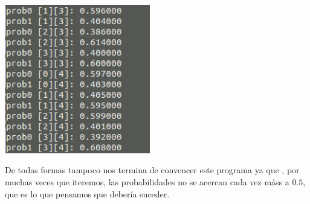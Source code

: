 \documentclass{apuntes}
\begin{document}
\begin{center}
		\includegraphics[width=180pt]{SACyBIC2PS.png}
\end{center}

De todas formas tampoco nos termina de convencer este programa ya que , por muchas veces que iteremos, las probabilidades no se acercan cada vez máss a $0.5$, que es lo que pensamos que debería suceder.


\printindex
\end{document}
